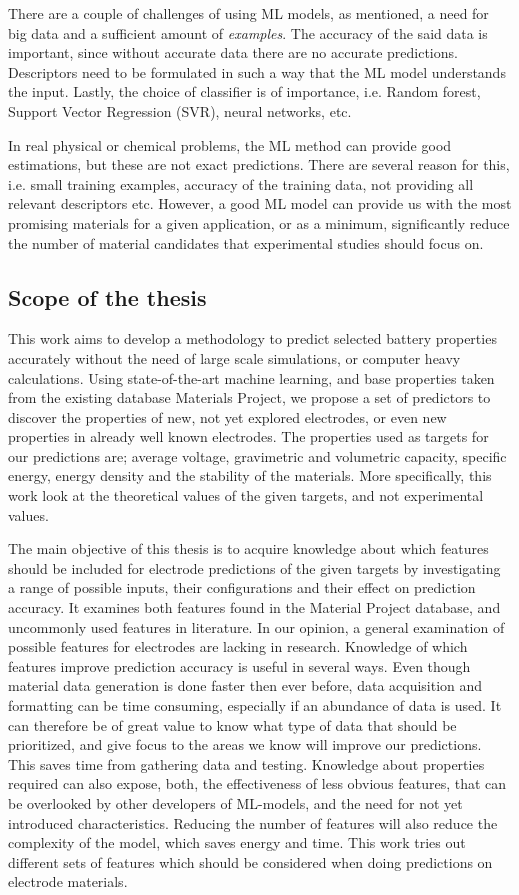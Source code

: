 There are a couple of challenges of using ML models, as mentioned, a need for big data and a sufficient amount of \textit{examples}. The accuracy of the said data is important, since without accurate data there are no accurate predictions. Descriptors need to be formulated in such a way that the ML model understands the input. Lastly, the choice of classifier is of importance, i.e. Random forest, Support Vector Regression (\ac{SVR}), neural networks, etc.  

In real physical or chemical problems, the ML method can provide good estimations, but these are not exact predictions. There are several reason for this, i.e. small training examples, accuracy of the training data, not providing all relevant descriptors etc.  However, a good ML model can provide us with the most promising materials for a given application, or as a minimum, significantly reduce the number of material candidates that experimental studies should focus on. 

\subsection{Scope of the thesis}
This work aims to develop a methodology to predict selected battery properties accurately without the need of large scale simulations, or computer heavy calculations. Using state-of-the-art machine learning, and base properties taken from the existing database Materials Project, we propose a set of predictors to discover the properties of new, not yet explored electrodes, or even new properties in already well known electrodes. The properties used as targets for our predictions are; average voltage, gravimetric and volumetric capacity, specific energy, energy density and the stability of the materials. More specifically, this work look at the theoretical values of the given targets, and not experimental values. 
	
	The main objective of this thesis is to acquire knowledge about which features should be included for electrode predictions of the given targets by investigating a range of possible inputs, their configurations and their effect on prediction accuracy. It examines both features found in the Material Project database, and uncommonly used features in literature. In our opinion, a general examination of possible features for electrodes are lacking in research. Knowledge of which features improve prediction accuracy is useful in several ways. Even though material data generation is done faster then ever before, data acquisition and formatting can be time consuming, especially if an abundance of data is used. It can therefore be of great value to know what type of data that should be prioritized, and give focus to the areas we know will improve our predictions. This saves time from gathering data and testing. Knowledge about properties required can also expose, both, the effectiveness of less obvious features, that can be overlooked by other developers of ML-models, and the need for not yet introduced characteristics. Reducing the number of features will also reduce the complexity of the model, which saves energy and time. This work tries out different sets of features which should be considered when doing predictions on electrode materials.

